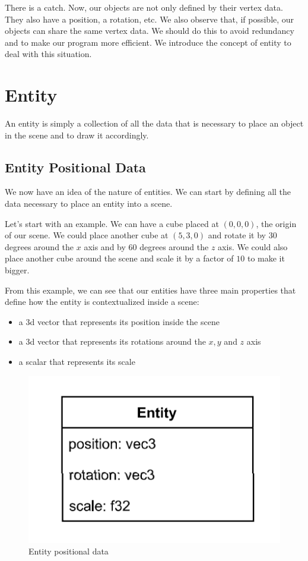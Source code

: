 There is a catch.
Now, our objects are not only defined by their vertex data.
They also have a position, a rotation, etc.
We also observe that, if possible, our objects can share the same vertex data.
We should do this to avoid redundancy and to make our program more efficient.
We introduce the concept of entity to deal with this situation.

\section{Entity}

An entity is simply a collection of all the data that is necessary to place
an object in the scene and to draw it accordingly.

\subsection{Entity Positional Data}

We now have an idea of the nature of entities.
We can start by defining all the data necessary
to place an entity into a scene.

Let's start with an example.
We can have a cube placed at $(0, 0, 0)$, the origin of our scene.
We could place another cube at $(5, 3, 0)$ and rotate it by $30$
degrees around the $x$ axis and by $60$ degrees around the $z$ axis.
We could also place another cube around the scene and scale it by a factor
of $10$ to make it bigger.

From this example, we can see that our entities have three main properties
that define how the entity is contextualized inside a scene:
\begin{itemize}
    \item a 3d vector that represents its position inside the scene
    \item a 3d vector that represents its rotations around the $x, y$ and $z$ axis
    \item a scalar that represents its scale
\end{itemize}

\begin{figure}[ht]
    \centering
    \includegraphics[scale=0.50]{images/ChScene/EntityPositionalData.png}
    \caption{Entity positional data}
    \label{fig::EntityPositionalData}
\end{figure}

